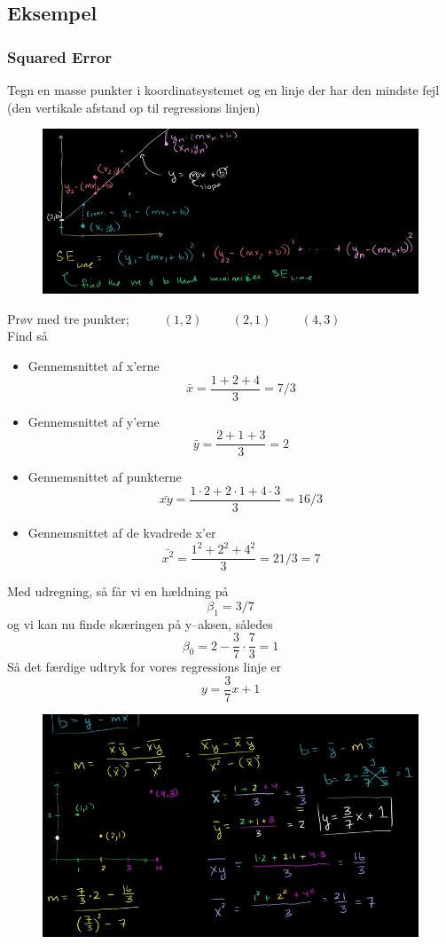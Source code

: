 \documentclass[11pt]{article}
\begin{document}
\subsection{Eksempel}
\subsubsection{Squared Error}
Tegn en masse punkter i koordinatsystemet og en linje der har den mindste fejl (den vertikale afstand op til regressions linjen)
\begin{figure}[H]
\centering
\includegraphics[scale=0.5]{img/Selection_020}
\end{figure}
Prøv med tre punkter; $\hspace{1cm}(1,2)\hspace{1cm}(2,1)\hspace{1cm}(4,3)$\\[0.2cm]
Find så
\begin{itemize}\itemsep-2pt
\item Gennemsnittet af x'erne
$$\bar{x}=\frac{1+2+4}{3}=7/3$$
\item Gennemsnittet af y'erne
$$\bar{y}=\frac{2+1+3}{3}=2$$
\item Gennemsnittet af punkterne
$$\bar{xy}=\frac{1\cdot 2+2\cdot 1+4\cdot 3}{3}=16/3$$
\item Gennemsnittet af de kvadrede x'er
$$\bar{x^2}=\frac{1^2+2^2+4^2}{3}=21/3=7$$
\end{itemize}
Med udregning, så får vi en hældning på
$$\beta_1=3/7$$
og vi kan nu finde skæringen på y--aksen, således
$$\beta_0=2-\frac{3}{7}\cdot \frac{7}{3}=1$$
Så det færdige udtryk for vores regressions linje er
$$y=\frac{3}{7}x+1$$
\begin{figure}[H]
\centering
\includegraphics[scale=0.5]{img/Selection_021}
\end{figure}
\end{document}

